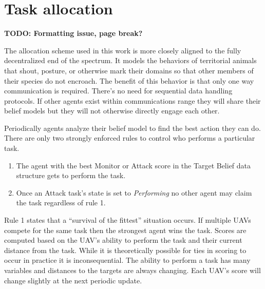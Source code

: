 

\section{Task allocation}
\label{sec:uncoordTaskingMyWork}
\textbf{TODO: Formatting issue, page break?}

The allocation scheme used in this work is more closely aligned to the fully decentralized end of the spectrum.  It models the behaviors of territorial animals that shout, posture, or otherwise mark their domains so that other members of their species do not encroach.  The benefit of this behavior is that only one way communication is required.  There's no need for sequential data handling protocols.  If other agents exist within communications range they will share their belief models but they will not otherwise directly engage each other.  

Periodically agents analyze their belief model to find the best action they can do.  There are only two strongly enforced rules to control who performs a particular task.  

\begin{enumerate}
	\item The agent with the best Monitor or Attack score in the Target Belief data structure gets to perform the task.
	\item Once an Attack task's state is set to \textit{Performing} no other agent may claim the task regardless of rule 1.
\end{enumerate}

Rule 1 states that a ``survival of the fittest'' situation occurs.  If multiple UAVs compete for the same task then the strongest agent wins the task.  Scores are computed based on the UAV's ability to perform the task and their current distance from the task.  While it is theoretically possible for ties in scoring to occur in practice it is inconsequential.  The ability to perform a task has many variables and distances to the targets are always changing.  Each UAV's score will change slightly at the next periodic update.

